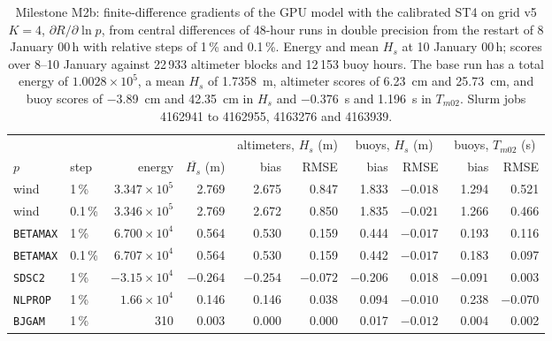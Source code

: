 \documentclass[11pt,a4paper]{article}
\begin{document}
\begin{table}[H]
\centering\small
\setlength{\tabcolsep}{4pt}
\begin{tabular}{llrrrrrrrr}
\toprule
 & & & & \multicolumn{2}{c}{altimeters, $H_s$ (m)} & \multicolumn{2}{c}{buoys, $H_s$ (m)} & \multicolumn{2}{c}{buoys, $T_{m02}$ (s)} \\
$p$ & step & energy & $\overline{H_s}$ (m) & bias & RMSE & bias & RMSE & bias & RMSE \\
\midrule
wind & 1\,\% & $3.347\times10^{5}$ & 2.769 & 2.675 & 0.847 & 1.833 & $-0.018$ & 1.294 & 0.521 \\
wind & 0.1\,\% & $3.346\times10^{5}$ & 2.769 & 2.672 & 0.850 & 1.835 & $-0.021$ & 1.266 & 0.466 \\
\texttt{BETAMAX} & 1\,\% & $6.700\times10^{4}$ & 0.564 & 0.530 & 0.159 & 0.444 & $-0.017$ & 0.193 & 0.116 \\
\texttt{BETAMAX} & 0.1\,\% & $6.707\times10^{4}$ & 0.564 & 0.530 & 0.159 & 0.442 & $-0.017$ & 0.183 & 0.097 \\
\texttt{SDSC2} & 1\,\% & $-3.15\times10^{4}$ & $-0.264$ & $-0.254$ & $-0.072$ & $-0.206$ & 0.018 & $-0.091$ & 0.003 \\
\texttt{NLPROP} & 1\,\% & $1.66\times10^{4}$ & 0.146 & 0.146 & 0.038 & 0.094 & $-0.010$ & 0.238 & $-0.070$ \\
\texttt{BJGAM} & 1\,\% & 310 & 0.003 & 0.000 & 0.000 & 0.017 & $-0.012$ & 0.004 & 0.002 \\
\bottomrule
\end{tabular}
\caption{Milestone M2b: finite-difference gradients of the GPU model with
the calibrated ST4 on grid v5 $K=4$, $\partial R/\partial\ln p$, from
central differences of 48-hour runs in double precision from the restart
of 8 January 00\,h with relative steps of 1\,\% and 0.1\,\%. Energy and
mean $H_s$ at 10 January 00\,h; scores over 8--10 January against 22\,933
altimeter blocks and 12\,153 buoy hours. The base run has a total energy
of $1.0028\times10^{5}$, a mean $H_s$ of \SI{1.7358}{m}, altimeter scores
of \SI{+6.23}{cm} and \SI{25.73}{cm}, and buoy scores of \SI{-3.89}{cm}
and \SI{42.35}{cm} in $H_s$ and \SI{-0.376}{s} and \SI{1.196}{s} in
$T_{m02}$. Slurm jobs 4162941 to 4162955, 4163276 and 4163939.}
\label{tab:m2grad}
\end{table}
\end{document}

